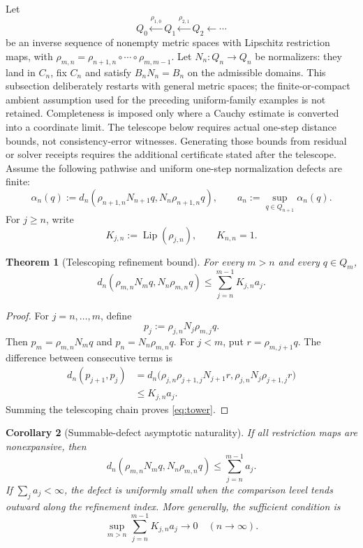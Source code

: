 \documentclass[11pt]{article}
\newtheorem{theorem}{Theorem}[section]
\newtheorem{corollary}[theorem]{Corollary}
\theoremstyle{definition}
\theoremstyle{remark}
\numberwithin{equation}{section}
\newcommand{\Lip}{\operatorname{Lip}}
\begin{document}
Let
\[
 Q_0\xleftarrow{\rho_{1,0}}Q_1
 \xleftarrow{\rho_{2,1}}Q_2\xleftarrow{}\cdots
\]
be an inverse sequence of nonempty metric spaces with Lipschitz restriction
maps, with
$\rho_{m,n}=\rho_{n+1,n}\circ\cdots\circ\rho_{m,m-1}$.  Let
$N_n:Q_n\to Q_n$ be normalizers: they land in $C_n$, fix $C_n$ and satisfy
$B_nN_n=B_n$ on the admissible domains. This subsection deliberately restarts with general metric spaces; the
finite-or-compact ambient assumption used for the preceding uniform-family
examples is not retained.  Completeness is imposed only where a Cauchy
estimate is converted into a coordinate limit. The telescope below requires
actual one-step distance bounds, not consistency-error witnesses. Generating
those bounds from residual or solver receipts requires the additional
certificate stated after the telescope.
Assume the following pathwise and uniform one-step normalization defects are
finite:
\[
 \alpha_n(q)
 :=
 d_n(\rho_{n+1,n}N_{n+1}q,N_n\rho_{n+1,n}q),
 \qquad
 a_n:=\sup_{q\in Q_{n+1}}\alpha_n(q).
\]
For $j\ge n$, write
\[
 K_{j,n}:=\Lip(\rho_{j,n}),\qquad K_{n,n}=1.
\]

\begin{theorem}[Telescoping refinement bound]\label{thm:tower}
For every $m>n$ and every $q\in Q_m$,
\begin{equation}\label{eq:tower}
 d_n(\rho_{m,n}N_mq,N_n\rho_{m,n}q)
 \le
 \sum_{j=n}^{m-1}K_{j,n}a_j.
\end{equation}
\end{theorem}

\begin{proof}
For $j=n,\dots,m$, define
\[
 p_j:=\rho_{j,n}N_j\rho_{m,j}q.
\]
Then $p_m=\rho_{m,n}N_mq$ and $p_n=N_n\rho_{m,n}q$.  For $j<m$, put $r=\rho_{m,j+1}q$.  The difference between consecutive terms is
\begin{align*}
 d_n(p_{j+1},p_j)
 &=d_n\bigl(
 \rho_{j,n}\rho_{j+1,j}N_{j+1}r,
 \rho_{j,n}N_j\rho_{j+1,j}r
 \bigr)\\
 &\le K_{j,n}a_j.
\end{align*}
Summing the telescoping chain proves \eqref{eq:tower}.
\end{proof}

\begin{corollary}[Summable-defect asymptotic naturality]\label{cor:summable}
If all restriction maps are nonexpansive, then
\[
 d_n(\rho_{m,n}N_mq,N_n\rho_{m,n}q)
 \le\sum_{j=n}^{m-1}a_j.
\]
If $\sum_ja_j<\infty$, the defect is uniformly small when the comparison
level tends outward along the refinement index.  More generally, the
sufficient condition is
\[
 \sup_{m>n}\sum_{j=n}^{m-1}K_{j,n}a_j\longrightarrow0
 \quad(n\to\infty).
\]
\end{corollary}
\end{document}
